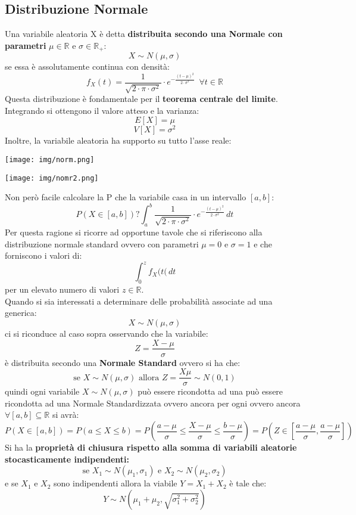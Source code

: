 \documentclass[a4paper,12pt, oneside]{book}
\newcommand{\numberset}{\mathbb}
\newcommand{\R}{\numberset{R}}
\begin{document}
\subsection{Distribuzione Normale}
Una variabile aleatoria X è detta \textbf{distribuita secondo una Normale con parametri} $\mu\in\R$ e $\sigma\in\R_+$:
\[X\sim N(\mu,\sigma)\]
se essa è assolutamente continua con densità:
\[f_X(t)=\frac{1}{\sqrt{2\cdot \pi\cdot \sigma^2}}\cdot e^{-\frac{(t-\mu)^2}{2\cdot \sigma^2}}\,\,\,\forall t\in\R\]
Questa distribuzione è fondamentale per il \textbf{teorema centrale del limite}.\\
Integrando si ottengono il valore atteso e la varianza:
\[E[X]=\mu\]
\[V[X]=\sigma^2\]
Inoltre, la variabile aleatoria ha supporto su tutto l'asse reale:
\begin{center}
\texttt{[image: img/norm.png]}
\end{center}
\begin{center}
\texttt{[image: img/nomr2.png]}
\end{center}
Non però facile calcolare la P che la variabile casa in un intervallo $[a,b]$:
\[P(X\in[a,b])?\int_a^b \frac{1}{\sqrt{2\cdot \pi\cdot \sigma^2}}\cdot e^{-\frac{(t-\mu)^2}{2\cdot \sigma^2}}\,dt\]
Per questa ragione si ricorre ad opportune tavole che si riferiscono alla distribuzione
normale standard ovvero con parametri $\mu=0$ e $\sigma=1$ e che forniscono i valori di:
\[\int_0^z f_X(t(\,dt\]
per un elevato numero di valori $z\in\R$.\\
Quando si sia interessati a determinare delle probabilità associate ad una generica:
\[X\sim N(\mu,\sigma)\]
ci si riconduce al caso sopra osservando che la variabile:
\[Z=\frac{X-\mu}{\sigma}\]
è distribuita secondo una \textbf{Normale Standard} ovvero si ha che:
\[\mbox{se }X\sim N(\mu,\sigma)\mbox{ allora }Z=\frac{X\mu}{\sigma}\sim N(0,1)\]
quindi ogni variabile $X\sim N(\mu,\sigma)$ può essere ricondotta ad una può essere ricondotta ad
una Normale Standardizzata ovvero ancora per ogni ovvero ancora $\forall [a,b]\subseteq\R$ si avrà:
\[P(X\in[a,b])=P(a\leq X\leq b)=P\left(\frac{a-\mu}{\sigma}\leq \frac{X-\mu}{\sigma}\leq \frac{b-\mu}{\sigma}\right)=P\left(Z\in\left[\frac{a-\mu}{\sigma},\frac{a-\mu}{\sigma}\right]\right)\]
Si ha la \textbf{proprietà di chiusura rispetto alla somma di variabili aleatorie stocasticamente indipendenti:}
\[\mbox{se }X_1\sim N(\mu_1,\sigma_1)\mbox{ e }X_2\sim N(\mu_2,\sigma_2)\]
e se $X_1$ e $X_2$ sono indipendenti allora la viabile $Y=X_1+X_2$ è tale che:
\[Y\sim N(\mu_1+\mu_2,\sqrt{\sigma_1^2+\sigma_2^2})\]
\end{document}
